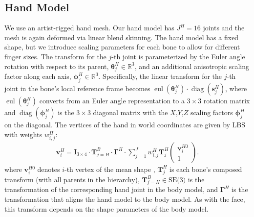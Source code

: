 \subsection{Hand Model}
We use an artist-rigged hand mesh. Our hand model has $J^H{=}16$ joints and the mesh is again deformed via linear blend skinning. The hand model has a fixed shape, but we introduce scaling parameters for each bone to allow for different finger sizes.
The transform for the $j$-th joint is parameterized by the Euler angle rotation
with respect to its parent, $\boldsymbol{\theta}_j^H\in\mathds{R}^3$, and an additional anisotropic scaling factor along each axis, $\boldsymbol{\phi}^H_j\in\mathds{R}^3$. Specifically, the linear transform for the $j$-th joint in the bone's local reference frame becomes $\operatorname{eul}(\boldsymbol{\theta}^H_j)\cdot \operatorname{diag}(\boldsymbol{s}^H_j)$, 
where $\operatorname{eul}(\boldsymbol{\theta}^H_j)$ converts from an Euler angle representation to a $3\times 3$ rotation matrix and $\operatorname{diag}(\boldsymbol{\phi}^H_j)$ is the $3\times 3$ diagonal matrix with the $X$,$Y$,$Z$ scaling factors $\mathbf{\phi}^H_j$ on the diagonal. The vertices of the hand in world coordinates are given by LBS with weights $w^H_{i,j}$: 
\begin{align}
\mathbf{v}^H_i= \mathbf{I}_{3\times 4} \cdot  \mathbf{T}^B_{j=H} \cdot \mathbf{\Gamma}^H \cdot \sum_{j=1}^J w^H_{i,j}\mathbf{T}^H_j \begin{pmatrix} \mathbf{v}_i^{H0} \\ 1 \end{pmatrix}.
\label{eq:lbs_hand}
\end{align}
where $\mathbf{v}^{H0}_i$ denotes $i$-th vertex of the mean shape , $\mathbf{T}^H_j$ is each bone's composed transform (with all parents in the hierarchy), $\mathbf{T}^B_{j=H}  \in \textrm{SE(3)}$ is the transformation of the corresponding hand joint in the body model, and $\mathbf{\Gamma}^H$ is the transformation that aligns the hand model to the body model. As with the face, this transform depends on the shape parameters of the body model.



